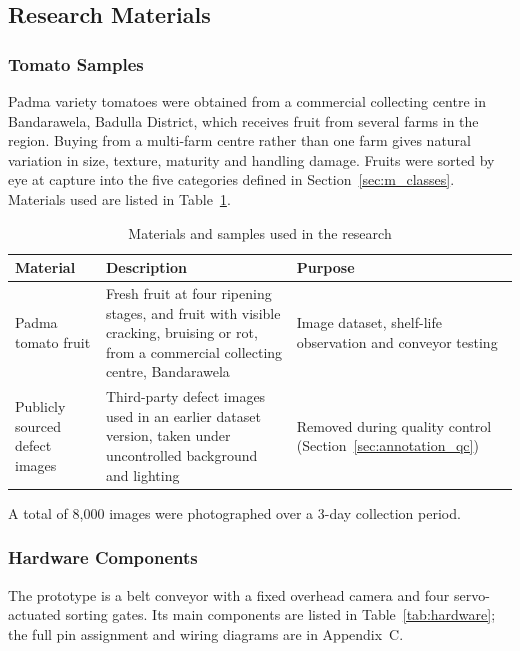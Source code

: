 \subsection{Research Materials}
\label{sec:m_materials}

\subsubsection{Tomato Samples}
\label{sec:m_samples}

Padma variety tomatoes were obtained from a commercial collecting centre in Bandarawela, Badulla District, which receives fruit from several farms in the region. Buying from a multi-farm centre rather than one farm gives natural variation in size, texture, maturity and handling damage. Fruits were sorted by eye at capture into the five categories defined in Section~\ref{sec:m_classes}. Materials used are listed in Table~\ref{tab:materials}.

\begin{table}[H]
\caption{Materials and samples used in the research}
\label{tab:materials}
\centering
\begin{tabularx}{\textwidth}{p{3.1cm} X p{2.7cm}}
\toprule
\textbf{Material} & \textbf{Description} & \textbf{Purpose} \\
\midrule
Padma tomato fruit &
Fresh fruit at four ripening stages, and fruit with visible cracking, bruising or rot, from a commercial collecting centre, Bandarawela &
Image dataset, shelf-life observation and conveyor testing \\
\addlinespace
Publicly sourced defect images &
Third-party defect images used in an earlier dataset version, taken under uncontrolled background and lighting &
Removed during quality control (Section~\ref{sec:annotation_qc}) \\
\bottomrule
\end{tabularx}
\end{table}

A total of 8{,}000 images were photographed over a 3-day collection period.


\subsubsection{Hardware Components}
\label{sec:m_hardware}

The prototype is a belt conveyor with a fixed overhead camera and four servo-actuated sorting gates. Its main components are listed in Table~\ref{tab:hardware}; the full pin assignment and wiring diagrams are in Appendix~C.

